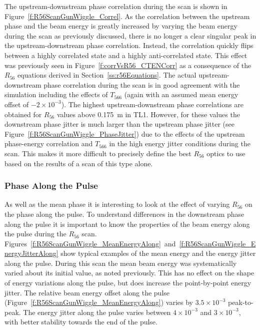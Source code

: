 The upstream-downstream phase correlation during the scan is shown in Figure~\ref{f:R56ScanGunWiggle_Correl}. As the correlation between the upstream phase and the beam energy is greatly increased by varying the beam energy during the scan as previously discussed, there is no longer a clear singular peak in the upstream-downstream phase correlation. Instead, the correlation quickly flips between a highly correlated state and a highly anti-correlated state. This effect was previously seen in Figure~\ref{f:corrVsR56_CTENCorr} as a consequence of the \(R_{56}\) equations derived in Section~\ref{ss:r56Equations}. The actual upstream-downstream phase correlation during the scan is in good agreement with the simulation including the effects of \(T_{566}\) (again with an assumed mean energy offset of \(-2\times10^{-3}\)). 
The highest upstream-downstream phase correlations are obtained for \(R_{56}\) values above 0.175~m in TL1.
However, for these values the downstream phase jitter is much larger than the upstream phase jitter (see Figure~\ref{f:R56ScanGunWiggle_PhaseJitter}) due to the effects of the upstream phase-energy correlation and \(T_{566}\) in the high energy jitter conditions during the scan. This makes it more difficult to precisely define the best \(R_{56}\) optics to use based on the results of a scan of this type alone.



\subsubsection{Phase Along the Pulse}

As well as the mean phase it is interesting to look at the effect of varying \(R_{56}\) on the phase along the pulse. To understand differences in the downstream phase along the pulse it is important to know the properties of the beam energy along the pulse during the \(R_{56}\) scan. Figures~\ref{f:R56ScanGunWiggle_MeanEnergyAlong}~and~\ref{f:R56ScanGunWiggle_EnergyJitterAlong} show typical examples of the mean energy and the energy jitter along the pulse. During this scan the mean beam energy was systematically varied about its initial value, as noted previously. This has no effect on the shape of energy variations along the pulse, but does increase the point-by-point energy jitter. The relative beam energy offset along the pulse (Figure~\ref{f:R56ScanGunWiggle_MeanEnergyAlong}) varies by \(3.5\times10^{-3}\) peak-to-peak. The energy jitter along the pulse varies between \(4\times10^{-3}\) and \(3\times10^{-3}\), with better stability towards the end of the pulse.



